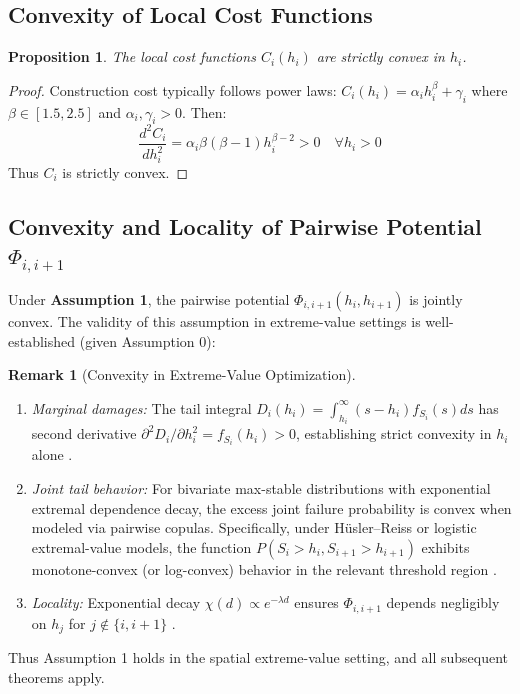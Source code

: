 \documentclass[12pt]{article}
\newtheorem{proposition}{Proposition}[section]
\theoremstyle{definition}
\newtheorem{remark}{Remark}[section]
\begin{document}
\subsection{Convexity of Local Cost Functions}

\begin{proposition}
The local cost functions $C_i(h_i)$ are strictly convex in $h_i$.
\end{proposition}

\begin{proof}
Construction cost typically follows power laws: $C_i(h_i) = \alpha_i h_i^\beta + \gamma_i$ where $\beta \in [1.5, 2.5]$ and $\alpha_i, \gamma_i > 0$. Then:
\[
\frac{d^2 C_i}{dh_i^2} = \alpha_i \beta(\beta-1) h_i^{\beta-2} > 0 \quad \forall h_i > 0
\]
Thus $C_i$ is strictly convex.
\end{proof}

\subsection{Convexity and Locality of Pairwise Potential $\Phi_{i,i+1}$}

Under \textbf{Assumption 1}, the pairwise potential $\Phi_{i,i+1}(h_i, h_{i+1})$ is jointly convex. The validity of this assumption in extreme-value settings is well-established (given Assumption 0):

\begin{remark}[Convexity in Extreme-Value Optimization]
\begin{enumerate}
    \item \emph{Marginal damages:} The tail integral $D_i(h_i) = \int_{h_i}^\infty (s-h_i) f_{S_i}(s)ds$ has second derivative $\partial^2 D_i/\partial h_i^2 = f_{S_i}(h_i) > 0$, establishing strict convexity in $h_i$ alone \cite{Rockafellar:ConvexAnalysis}.

    \item \emph{Joint tail behavior:} For bivariate max-stable distributions with exponential extremal dependence decay, the excess joint failure probability is convex when modeled via pairwise copulas. Specifically, under Hüsler--Reiss or logistic extremal-value models, the function $P(S_i > h_i, S_{i+1} > h_{i+1})$ exhibits monotone-convex (or log-convex) behavior in the relevant threshold region \cite{Coles:ExtremeStats}.

    \item \emph{Locality:} Exponential decay $\chi(d) \propto e^{-\lambda d}$ ensures $\Phi_{i,i+1}$ depends negligibly on $h_j$ for $j \not\in \{i, i+1\}$ \cite{DeHaan:ExtremeValue}.
\end{enumerate}

Thus Assumption 1 holds in the spatial extreme-value setting, and all subsequent theorems apply.
\end{remark}
\end{document}
